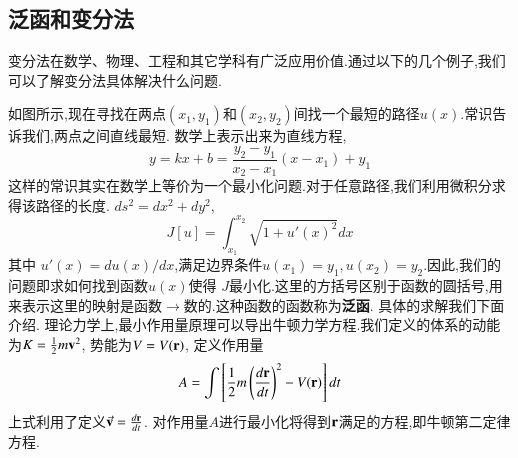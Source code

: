 \subsection{泛函和变分法}
\label{subsec:functional}
变分法在数学、物理、工程和其它学科有广泛应用价值.通过以下的几个例子,我们可以了解变分法具体解决什么问题.

如图所示,现在寻找在两点$(x_1, y_1)$和$(x_2,y_2)$间找一个最短的路径$u(x)$.常识告诉我们,两点之间直线最短.
数学上表示出来为直线方程,
\[
  y = k x + b = \frac{y_2 - y_1}{x_2 - x_1} ( x - x_1) + y_1  
\]
这样的常识其实在数学上等价为一个最小化问题.对于任意路径,我们利用微积分求得该路径的长度.
$ds^2 = dx^2 + dy^2$,
\[
J[u] = \int_{x_1}^{x_2} \sqrt{ 1 + u'(x)^2} dx    
\]
其中 $u'(x) = du(x)/dx$,满足边界条件$u(x_1) = y_1, u(x_2) = y_2$.因此,我们的问题即求如何找到函数$u(x)$使得
$J$最小化.这里的方括号区别于函数的圆括号,用来表示这里的映射是函数$\to$数的.这种函数的函数称为\textbf{泛函}.
具体的求解我们下面介绍.
理论力学上,最小作用量原理可以导出牛顿力学方程.我们定义的体系的动能为$K = {\frac{1}{2}} m {\mathbf{v}}^2$,
势能为$V = V({\mathbf{r}})$, 定义作用量
\begin{equation}
  A = \int \left[ {\frac{1}{2}} m \left( \frac{d{\mathbf{r}}}{dt} \right)^2 - V({\mathbf{r}}) \right] dt 
\end{equation}
上式利用了定义$\vec{{\mathbf{v}}} = \frac{d{\mathbf{r}}}{dt}$. 对作用量$A$进行最小化将得到${\mathbf{r}}$满足的方程,即牛顿第二定律方程.

